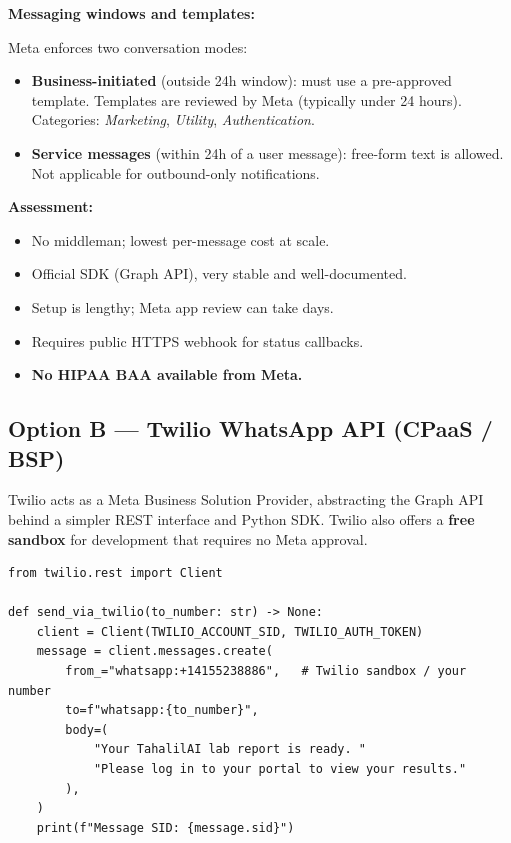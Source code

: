 \documentclass[12pt,a4paper]{article}
\newcommand{\pro}{\textcolor{green}{\textbf{+}}}
\newcommand{\con}{\textcolor{red}{\textbf{--}}}
\begin{document}
\noindent\textbf{Messaging windows and templates:}

Meta enforces two conversation modes:
\begin{itemize}[leftmargin=2em, itemsep=2pt]
    \item \textbf{Business-initiated} (outside 24h window): must use a
          pre-approved template. Templates are reviewed by Meta (typically
          under 24 hours). Categories: \emph{Marketing}, \emph{Utility},
          \emph{Authentication}.
    \item \textbf{Service messages} (within 24h of a user message): free-form
          text is allowed. Not applicable for outbound-only notifications.
\end{itemize}

\noindent\textbf{Assessment:}
\begin{itemize}[leftmargin=2em, itemsep=2pt]
    \item[\pro] No middleman; lowest per-message cost at scale.
    \item[\pro] Official SDK (Graph API), very stable and well-documented.
    \item[\con] Setup is lengthy; Meta app review can take days.
    \item[\con] Requires public HTTPS webhook for status callbacks.
    \item[\con] \textbf{No HIPAA BAA available from Meta.}
\end{itemize}

\subsection{Option B --- Twilio WhatsApp API (CPaaS / BSP)}

Twilio acts as a Meta Business Solution Provider, abstracting the Graph API
behind a simpler REST interface and Python SDK. Twilio also offers a
\textbf{free sandbox} for development that requires no Meta approval.

\begin{lstlisting}[style=python, caption={Twilio WhatsApp message (Python SDK)}]
from twilio.rest import Client

def send_via_twilio(to_number: str) -> None:
    client = Client(TWILIO_ACCOUNT_SID, TWILIO_AUTH_TOKEN)
    message = client.messages.create(
        from_="whatsapp:+14155238886",   # Twilio sandbox / your number
        to=f"whatsapp:{to_number}",
        body=(
            "Your TahalilAI lab report is ready. "
            "Please log in to your portal to view your results."
        ),
    )
    print(f"Message SID: {message.sid}")
\end{lstlisting}
\end{document}
